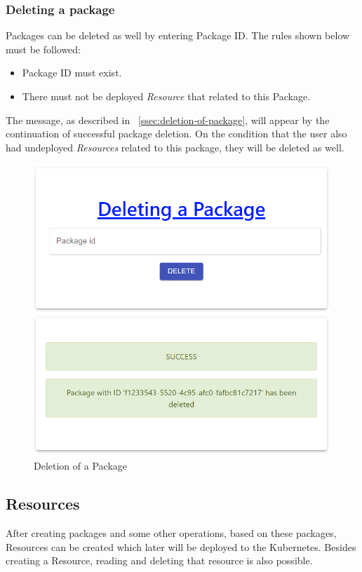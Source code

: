 \subsubsection{Deleting a package}
Packages can be deleted as well by entering Package ID. The rules shown below must be followed:
\begin{itemize}
  \item Package ID must exist.
  \item There must not be deployed \emph{Resource} that related to this Package.
\end{itemize}

The message, as described in ~\autoref{ssec:deletion-of-package}, will appear by the continuation of successful package deletion. On the condition that the user also had undeployed \emph{Resources} related to this package, they will be deleted as well.

\begin{figure}[H]
	\centering
	\includegraphics[width=130mm]{images/delete-package-2.png}
	\caption{Deletion of a Package}
	\label{ssec:deletion-of-package}
\end{figure}

\subsection{Resources}
After creating packages and some other operations, based on these packages, Resources can be created which later will be deployed to the Kubernetes. Besides creating a Resource, reading and deleting that resource is also possible.


